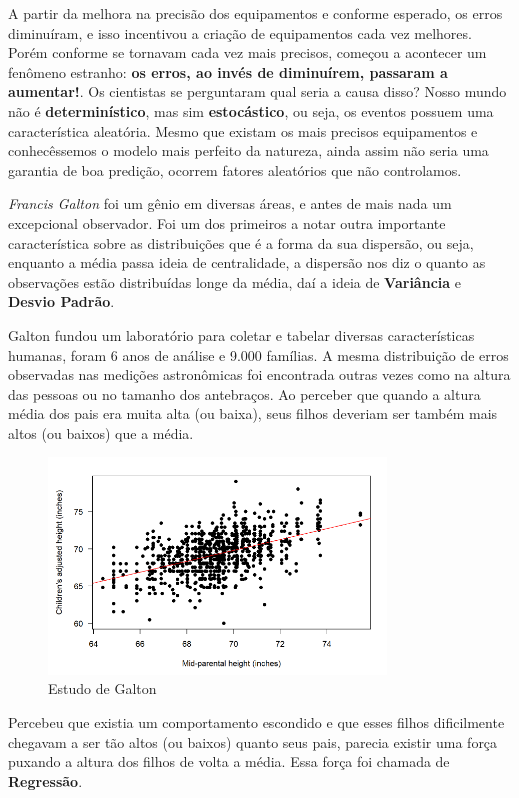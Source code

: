 \documentclass[a4paper,11pt]{article}
\begin{document}
A partir da melhora na precisão dos equipamentos e conforme esperado, os erros diminuíram, e isso incentivou a criação de equipamentos cada vez melhores. Porém conforme se tornavam cada vez mais precisos, começou a acontecer um fenômeno estranho: \textbf{os erros, ao invés de diminuírem, passaram a aumentar!}. Os cientistas se perguntaram qual seria a causa disso? Nosso mundo não é \textbf{determinístico}, mas sim \textbf{estocástico}, ou seja, os eventos possuem uma característica aleatória. Mesmo que existam os mais precisos equipamentos e conhecêssemos o modelo mais perfeito da natureza, ainda assim não seria uma garantia de boa predição, ocorrem fatores aleatórios que não controlamos.

\textit{Francis Galton} foi um gênio em diversas áreas, e antes de mais nada um excepcional observador. Foi um dos primeiros a notar outra importante característica sobre as distribuições que é a forma da sua dispersão, ou seja, enquanto a média passa ideia de centralidade, a dispersão nos diz o quanto as observações estão distribuídas longe da média, daí a ideia de \textbf{Variância} e \textbf{Desvio Padrão}.

Galton fundou um laboratório para coletar e tabelar diversas características humanas, foram 6 anos de análise e 9.000 famílias. A mesma distribuição de erros observadas nas medições astronômicas foi encontrada outras vezes como na altura das pessoas ou no tamanho dos antebraços. Ao perceber que quando a altura média dos pais era muita alta (ou baixa), seus filhos deveriam ser também mais altos (ou baixos) que a média.
\begin{figure}[H]
	\centering
	\includegraphics[width=0.8\textwidth]{imagens/galtonDataset.png}
	\caption{Estudo de Galton}
\end{figure}

Percebeu que existia um comportamento escondido e que esses filhos dificilmente chegavam a ser tão altos (ou baixos) quanto seus pais, parecia existir uma força puxando a altura dos filhos de volta a média. Essa força foi chamada de \textbf{Regressão}.
\end{document}

